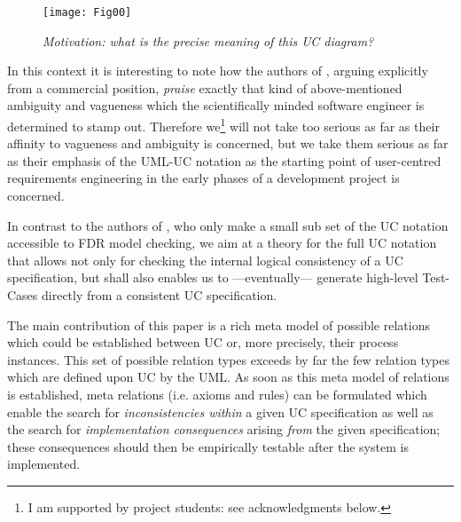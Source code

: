 \begin{figure}[t!]
\begin{center}
\texttt{[image: Fig00]}\\   
\caption{\it Motivation: what is the precise meaning of this UC diagram?}
\label{fig:INTRO} 
\end{center} 
\end{figure}

In this context it is interesting to note how the authors of \cite{KGu04}, 
arguing explicitly from a commercial position, \emph{praise} exactly that 
kind of above-mentioned ambiguity and vagueness which the scientifically 
minded software engineer is determined to stamp out. Therefore we\footnote{I 
	am supported by project students: see acknowledgments below.} will not 
take \cite{KGu04} too serious as far as their affinity to vagueness and 
ambiguity is concerned, but we take them serious as far as their emphasis 
of the UML-UC notation as the starting point of user-centred requirements 
engineering in the early phases of a development project is concerned. 

In contrast to the authors of \cite{SACJ35}, who only make a small 
sub set of the UC notation accessible to FDR model checking, we aim 
at a theory for the full UC notation that allows not only for checking 
the internal logical consistency of a UC specification, but shall also 
enables us to ---eventually--- generate high-level Test-Cases directly 
from a consistent UC specification. 

The main contribution of this paper is a rich meta model of possible
relations which could be established between UC or, more precisely,
their process instances. This set of possible relation types exceeds
by far the few relation types which are defined upon UC by the UML.
As soon as this meta model of relations is established, meta relations
(i.e. axioms and rules) can be formulated which enable the search for 
\emph{inconsistencies within} a given UC specification as well as the
search for \emph{implementation consequences} arising \emph{from} the
given specification; these consequences should then be empirically
testable after the system is implemented.


